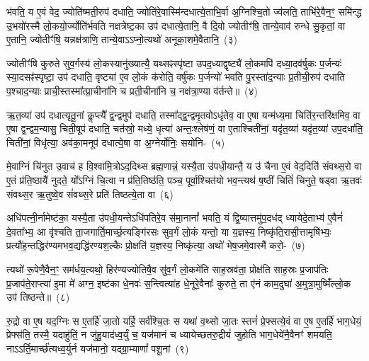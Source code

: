 भ॑वति॒ य ए॒वं वेद॒ ज्योति॑ष्मती॒रुप॑ दधाति॒ ज्योति॑रे॒वास्मि॑न्दधात्ये॒ताभि॒र्वा अ॒ग्निश्चि॒तो ज्व॑लति॒ ताभि॑रे॒वैन॒ꣳ॒ समि॑न्द्ध उ॒भयो॑रस्मै लो॒कयो॒र्ज्योति॑र्भवति नक्षत्रेष्ट॒का उप॑ दधात्ये॒तानि॒ वै दि॒वो ज्योतीꣳ॑षि॒ तान्ये॒वाव॑ रुन्धे सु॒कृतां॒ वा ए॒तानि॒ ज्योतीꣳ॑षि॒ यन्नक्ष॑त्राणि॒ तान्ये॒वा\-ऽऽ\-प्नो॒त्यथो॑ अनूका॒शमे॒वैतानि॒~(३)\ip

ज्योतीꣳ॑षि कुरुते सुव॒र्गस्य॑ लो॒कस्यानु॑ख्यात्यै॒ यथ्सꣴस्पृ॑ष्टा उपद॒ध्याद्वृष्ट्यै॑ लो॒कमपि॑ दध्या॒दव॑र्\mbox{}षुकः प॒र्जन्यः॑ स्या॒दसꣴ॑स्पृष्टा॒ उप॑ दधाति॒ वृष्ट्या॑ ए॒व लो॒कं क॑रोति॒ वर्\mbox{}षु॑कः प॒र्जन्यो॑ भवति पु॒रस्ता॑द॒न्याः प्र॒तीची॒रुप॑ दधाति प॒श्चाद॒न्याः प्राची॒स्तस्मा᳚त्प्रा॒चीना॑नि च प्रती॒चीना॑नि च॒ नक्ष॑त्रा॒ण्या व॑र्तन्ते॥~(४)\ip

{\anuvakamend[{भ्रातृ॑व्यो लो॒क ए॒वैतान्येक॑चत्वारिꣳशच्च}]}

ऋ॒त॒व्या॑ उप॑ दधात्यृतू॒नां कॢप्त्यै᳚ द्व॒न्द्वमुप॑ दधाति॒ तस्मा᳚द्\-द्व॒न्द्वमृ॒तवो\-ऽधृ॑तेव॒ वा ए॒षा यन्म॑ध्य॒मा चिति॑र॒न्तरि॑क्षमिव॒ वा ए॒षा द्व॒न्द्वम॒न्यासु॒ चिती॒षूप॑ दधाति॒ चत॑स्रो॒ मध्ये॒ धृत्या॑ अन्तः॒श्लेष॑णं॒ वा ए॒ताश्चिती॑नां॒ यदृ॑त॒व्या॑ यदृ॑त॒व्या॑ उप॒\-दधा॑ति॒ चिती॑नां॒ विधृ॑त्या॒ अव॑का॒मनूप॑ दधात्ये॒षा वा अ॒ग्नेर्योनिः॒ सयो॑नि-~(५)\ip

मे॒वाग्निं चि॑नुत उ॒वाच॑ ह वि॒श्वामि॒त्रो\-ऽद॒दिथ्स ब्रह्म॒णान्नं॒ यस्यै॒ता उ॑पधी॒यान्तै॒ य उ॑ चैना ए॒वं वेद॒दिति॑ संवथ्स॒रो वा ए॒तं प्र॑ति॒ष्ठायै॑ नुदते॒ यो᳚\-ऽग्निं चि॒त्वा न प्र॑ति॒तिष्ठ॑ति॒ पञ्च॒ पूर्वा॒श्चित॑यो भव॒न्त्यथ॑ ष॒ष्ठीं चितिं॑ चिनुते॒ षड्वा ऋ॒तवः॑ संवथ्स॒र ऋ॒तुष्वे॒व सं॑वथ्स॒रे प्रति॑ तिष्ठत्ये॒ता वा~(६)\ip

अधि॑पत्नी॒र्नामेष्ट॑का॒ यस्यै॒ता उ॑पधी॒यन्ते\-ऽधि॑\-पतिरे॒व स॑मा॒नानां᳚ भवति॒ यं द्वि॒ष्यात्तमु॑प॒दध॑द् ध्यायेदे॒ताभ्य॑ ए॒वैनं॑ दे॒वता᳚भ्य॒ आ वृ॑श्चति ता॒जगार्ति॒मार्च्छ॒त्यङ्गि॑रसः सुव॒र्गं लो॒कं यन्तो॒ या य॒ज्ञस्य॒ निष्कृ॑ति॒रासी॒त्तामृषि॑भ्यः॒ प्रत्यौ॑ह॒न्तद्धिर॑ण्यमभव॒द्यद्धि॑रण्यश॒ल्कैः प्रो॒क्षति॑ य॒ज्ञस्य॒ निष्कृ॑त्या॒ अथो॑ भेष॒जमे॒वास्मै॑ करो॒-~(७)\ip

त्यथो॑ रू॒पेणै॒वैन॒ꣳ॒ सम॑र्धय॒त्यथो॒ हिर॑ण्यज्योतिषै॒व सु॑व॒र्गं लो॒कमे॑ति साह॒स्रव॑ता॒ प्रोक्ष॑ति साह॒स्रः प्र॒जा\-प॑तिः प्र॒जा\-प॑ते॒राप्त्या॑ इ॒मा मे॑ अग्न॒ इष्ट॑का धे॒नवः॑ स॒न्त्वित्या॑ह धे॒नूरे॒वैनाः᳚ कुरुते॒ ता ए॑नं काम॒दुघा॑ अ॒मुत्रा॒मुष्मिँ॑ल्लो॒क उप॑ तिष्ठन्ते॥~(८)\ip

{\anuvakamend[{सयो॑निमे॒ता वै क॑रो॒त्येका॒न्नच॑त्वारि॒ꣳ॒शच्च॑}]}

रु॒द्रो वा ए॒ष यद॒ग्निः स ए॒तर्\mbox{}हि॑ जा॒तो यर्\mbox{}हि॒ सर्व॑श्चि॒तः स यथा॑ व॒थ्सो जा॒तः स्तनं॑ प्रे॒फ्सत्ये॒वं वा ए॒ष ए॒तर्\mbox{}हि॑ भाग॒\-धेयं॒ प्रेफ्स॑ति॒ तस्मै॒ यदाहु॑तिं॒ न जु॑हु॒याद॑ध्व॒र्युं च॒ यज॑मानं च ध्यायेच्छतरु॒द्रीयं॑ जुहोति भाग॒\-धेये॑नै॒वैनꣳ॑ शमयति॒ नाऽऽर्ति॒मार्च्छ॑त्यध्व॒र्युर्न यज॑मानो॒ यद्ग्रा॒म्याणां᳚ पशू॒नां~(९)\ip

